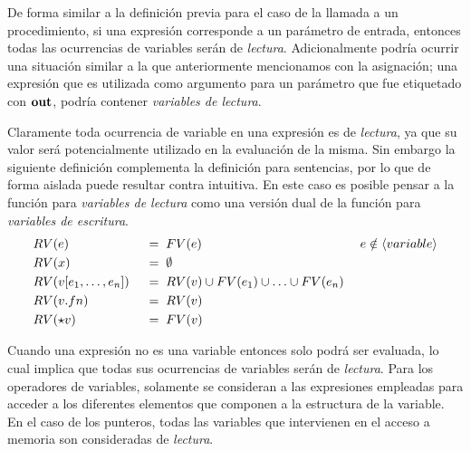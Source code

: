 De forma similar a la definición previa para el caso de la llamada a un procedimiento, si una expresión corresponde a un parámetro de entrada, entonces todas las ocurrencias de variables serán de \textit{lectura}.
Adicionalmente podría ocurrir una situación similar a la que anteriormente mencionamos con la asignación; una expresión que es utilizada como argumento para un parámetro que fue etiquetado con $\mathbf{out}$, podría contener \textit{variables de lectura}.

Claramente toda ocurrencia de variable en una expresión es de \textit{lectura}, ya que su valor será potencialmente utilizado en la evaluación de la misma.
Sin embargo la siguiente definición complementa la definición para sentencias, por lo que de forma aislada puede resultar contra intuitiva.
En este caso es posible pensar a la función para \textit{variables de lectura} como una versión dual de la función para \textit{variables de escritura}.
\begin{alignat*}{3}
&RV(e)
&&\;=\;
FV(e)
&&\;e \notin \langle variable \rangle
\\
&RV(x)
&&\;=\;
\emptyset
\\
&RV(v [e_1, \ldots, e_n])
&&\;=\;
RV(v) \cup FV(e_1) \cup \ldots \cup FV(e_n)
\\
&RV(v.fn)
&&\;=\;
RV(v)
\\
&RV(\star v)
&&\;=\;
FV(v)
\end{alignat*}

Cuando una expresión no es una variable entonces solo podrá ser evaluada, lo cual implica que todas sus ocurrencias de variables serán de \textit{lectura}.
Para los operadores de variables, solamente se consideran a las expresiones empleadas para acceder a los diferentes elementos que componen a la estructura de la variable.
En el caso de los punteros, todas las variables que intervienen en el acceso a memoria son consideradas de \textit{lectura}.


